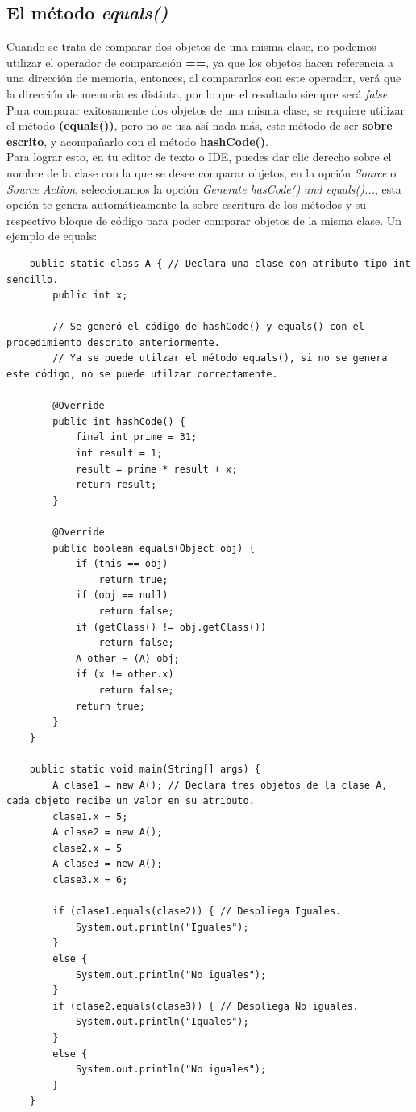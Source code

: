 \subsection{El método \textit{equals()}}
\hspace{0.55cm}Cuando se trata de comparar dos objetos de una misma clase, no podemos utilizar el operador de comparación \textbf{==}, ya que los objetos hacen referencia a una dirección de memoria, entonces, al compararlos con este operador, verá que la dirección de memoria es distinta, por lo que el resultado siempre será \textit{false}. Para comparar exitosamente dos objetos de una misma clase, se requiere utilizar el método \textbf{(equals())}, pero no se usa así nada más, este método de ser \textbf{sobre escrito}, y acompañarlo con el método \textbf{hashCode()}.\\
Para lograr esto, en tu editor de texto o IDE, puedes dar clic derecho sobre el nombre de la clase con la que se desee comparar objetos, en la opción \textit{Source} o \textit{Source Action}, seleccionamos la opción \textit{Generate hasCode() and equals()...}, esta opción te genera automáticamente la sobre escritura de los métodos y su respectivo bloque de código para poder comparar objetos de la misma clase. Un ejemplo de equals:
\begin{lstlisting}
    public static class A { // Declara una clase con atributo tipo int sencillo.
        public int x;
        
        // Se generó el código de hashCode() y equals() con el procedimiento descrito anteriormente.
        // Ya se puede utilzar el método equals(), si no se genera este código, no se puede utilzar correctamente.
        
        @Override
        public int hashCode() {
            final int prime = 31;
            int result = 1;
            result = prime * result + x;
            return result;
        }

        @Override
        public boolean equals(Object obj) {
            if (this == obj)
                return true;
            if (obj == null)
                return false;
            if (getClass() != obj.getClass())
                return false;
            A other = (A) obj;
            if (x != other.x)
                return false;
            return true;
        }
    }
    
    public static void main(String[] args) {
        A clase1 = new A(); // Declara tres objetos de la clase A, cada objeto recibe un valor en su atributo.
        clase1.x = 5;
        A clase2 = new A();
        clase2.x = 5
        A clase3 = new A();
        clase3.x = 6;
        
        if (clase1.equals(clase2)) { // Despliega Iguales.
            System.out.println("Iguales"); 
        }
        else {
            System.out.println("No iguales");
        }
        if (clase2.equals(clase3)) { // Despliega No iguales.
            System.out.println("Iguales");
        }
        else {
            System.out.println("No iguales");
        }
    }
\end{lstlisting}


